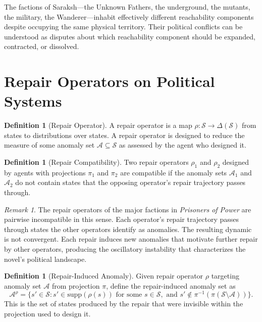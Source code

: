 \documentclass[12pt, a4paper]{article}
\theoremstyle{plain}
\theoremstyle{definition}
\newtheorem{definition}[theorem]{Definition}
\theoremstyle{remark}
\newtheorem{remark}[theorem]{Remark}
\begin{document}
The factions of Saraksh---the Unknown Fathers,
the underground, the mutants, the military, the
Wanderer---inhabit effectively different
reachability components despite occupying the
same physical territory. Their political conflicts
can be understood as disputes about which
reachability component should be expanded,
contracted, or dissolved.

\section{Repair Operators on Political Systems}

\begin{definition}[Repair Operator]
A repair operator is a map $\rho: \mathcal{S}
\to \Delta(\mathcal{S})$ from states to
distributions over states. A repair operator
is designed to reduce the measure of some
anomaly set $\mathcal{A} \subseteq \mathcal{S}$
as assessed by the agent who designed it.
\end{definition}

\begin{definition}[Repair Compatibility]
Two repair operators $\rho_1$ and $\rho_2$
designed by agents with projections $\pi_1$
and $\pi_2$ are compatible if the anomaly sets
$\mathcal{A}_1$ and $\mathcal{A}_2$ do not
contain states that the opposing operator's
repair trajectory passes through.
\end{definition}

\begin{remark}
The repair operators of the major factions in
\textit{Prisoners of Power} are pairwise
incompatible in this sense. Each operator's
repair trajectory passes through states the
other operators identify as anomalies. The
resulting dynamic is not convergent. Each
repair induces new anomalies that motivate
further repair by other operators, producing
the oscillatory instability that characterizes
the novel's political landscape.
\end{remark}

\begin{definition}[Repair-Induced Anomaly]
Given repair operator $\rho$ targeting anomaly
set $\mathcal{A}$ from projection $\pi$,
define the repair-induced anomaly set as
\[
\mathcal{A}^\rho = \{s' \in \mathcal{S} :
s' \in \mathrm{supp}(\rho(s))
\text{ for some } s \in \mathcal{S},
\text{ and } s' \notin \pi^{-1}(\pi(\mathcal{S}
\setminus \mathcal{A}))\}.
\]
This is the set of states produced by the
repair that were invisible within the projection
used to design it.
\end{definition}
\end{document}
